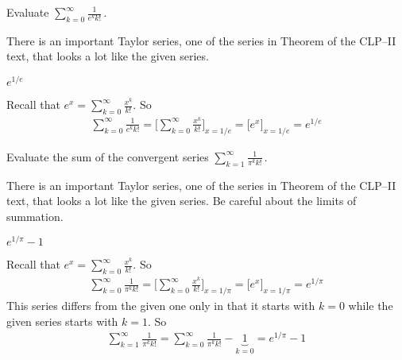 \begin{Mquestion}[M105 2013A]
Evaluate ${\displaystyle\sum_{k=0}^\infty\frac{1}{e^k k!}}\,$.
\end{Mquestion}

\begin{hint}
There is an important Taylor series, one of the series in
Theorem  of the
CLP--II text, that looks a lot like the given series.
\end{hint}

\begin{answer}
$e^{1/e}$
\end{answer}

\begin{solution}
Recall that $e^x = \displaystyle\sum\limits_{k=0}^\infty\frac{x^k}{k!}$. So
\begin{align*}
\sum_{k=0}^\infty\frac{1}{e^k k!}
=\Big[\sum_{k=0}^\infty\frac{x^k}{k!}\Big]_{x=1/e}
=\Big[e^x\Big]_{x=1/e}
=e^{1/e}
\end{align*}
\end{solution}

\begin{question}[M105 2013A]
Evaluate the sum of the convergent series
${\displaystyle\sum_{k=1}^\infty\frac{1}{\pi^k k!}}\,$.
\end{question}

\begin{hint}
There is an important Taylor series, one of the series in
Theorem  of the
CLP--II text, that looks a lot like the given series. Be careful about the
limits of summation.
\end{hint}

\begin{answer}
$e^{1/\pi}-1$
\end{answer}

\begin{solution}
Recall that $e^x = \displaystyle\sum\limits_{k=0}^\infty\frac{x^k}{k!}$. So
\begin{align*}
\sum_{k=0}^\infty\frac{1}{\pi^k k!}
=\Big[\sum_{k=0}^\infty\frac{x^k}{k!}\Big]_{x=1/\pi}
=\Big[e^x\Big]_{x=1/\pi}
=e^{1/\pi}
\end{align*}
This series differs from the given one only in that it starts with $k=0$ while
the given series starts with $k=1$. So
\begin{align*}
\sum_{k=1}^\infty\frac{1}{\pi^k k!}
=\sum_{k=0}^\infty\frac{1}{\pi^k k!} -\underbrace{1}_{k=0}
=e^{1/\pi}-1
\end{align*}

\end{solution}

